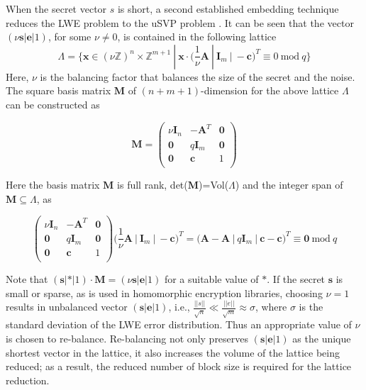 When the secret vector $s$ is short, a second established embedding technique reduces the LWE problem to the uSVP problem \cite{bai2014lattice,albrecht2017revisiting}. It can be seen that the vector $(\nu \textbf{s}| \textbf{e}|1)$, for some $\nu \ne 0$, is contained in the following lattice
\begin{equation*}
    \Lambda= \Big\{\textbf{x} \in (\nu \mathbb{Z})^{n} \times \mathbb{Z}^{m+1}\ |\ \textbf{x}\cdot \Big(\frac{1}{\nu} \textbf{A}\ |\ \textbf{I}_m \ |\ -\textbf{c} \Big)^{T} \equiv 0 \ \text{mod} \ q \Big\}
\end{equation*}
Here, $\nu$ is the balancing factor that balances the size of the secret and the noise. The square basis matrix $\textbf{M}$ of $(n+m+1)$-dimension for the above lattice $\Lambda$ can be constructed as

\begin{equation*}
    \textbf{M} =\begin{pmatrix}
        \nu \textbf{I}_n & -\textbf{A}^T & \textbf{0} \\
        \textbf{0}       & q\textbf{I}_m & \textbf{0} \\
        \textbf{0}       & \textbf{c}    & 1          \\
    \end{pmatrix}
\end{equation*}

Here the basis matrix $\textbf{M}$ is full rank, det($\textbf{M}$)=Vol($\Lambda$) and the integer span of $\textbf{M} \subseteq \Lambda$, as

\begin{equation*}
    \begin{pmatrix}
        \nu \textbf{I}_n & -\textbf{A}^T & \textbf{0} \\
        \textbf{0}       & q\textbf{I}_m & \textbf{0} \\
        \textbf{0}       & \textbf{c}    & 1          \\
    \end{pmatrix}
    \Big(\frac{1}{\nu} \textbf{A}\ |\ \textbf{I}_m \ |\ -\textbf{c} \Big)^{T} = \big( \textbf{A}-\textbf{A}\ |\ q\textbf{I}_m\ |\ \textbf{c}-\textbf{c}\big)^T \equiv \textbf{0} \ \text{mod} \ q
\end{equation*}

Note that $(\textbf{s}|*|1)\cdot \textbf{M}=(\nu\textbf{s}|\textbf{e}|1)$ for a suitable value of $*$. If the secret $\textbf{s}$ is small or sparse, as is used in homomorphic encryption libraries, choosing $\nu=1$ results in unbalanced vector $(\textbf{s}|\textbf{e}|1)$, i.e., $\frac{||s||}{\sqrt{n}} \ll \frac{||e||}{\sqrt{m}} \approx \sigma$, where $\sigma$ is the standard deviation of the LWE error distribution. Thus an appropriate value of $\nu$ is chosen to re-balance. Re-balancing not only preserves $(\textbf{s}|\textbf{e}|1)$ as the unique shortest vector in the lattice, it also increases the volume of the lattice being reduced; as a result, the reduced number of block size is required for the lattice reduction.

